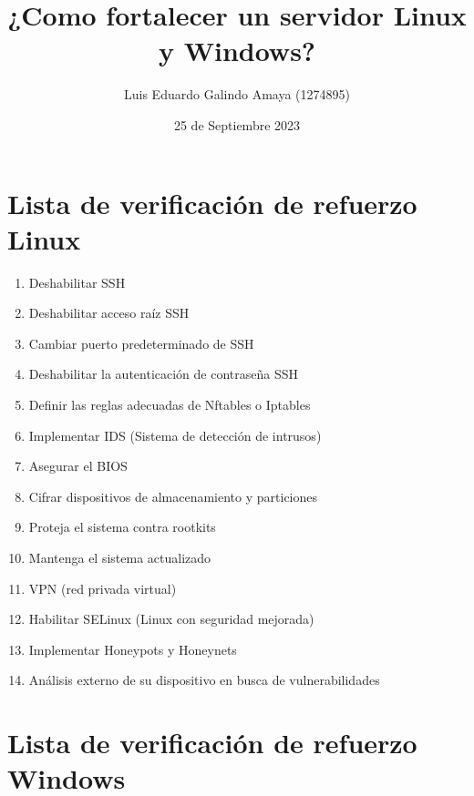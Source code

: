 \documentclass[11pt]{article}
\author{Luis Eduardo Galindo Amaya (1274895)}
\date{25 de Septiembre 2023}
\title{¿Como fortalecer un servidor Linux y Windows?}
\begin{document}
\tableofcontents
\pagebreak
{}

\section{Lista de verificación de refuerzo Linux}
\label{sec:org76e30e7}
\cite{lista_linux}

\begin{enumerate}
\item Deshabilitar SSH
\item Deshabilitar acceso raíz SSH
\item Cambiar puerto predeterminado de SSH
\item Deshabilitar la autenticación de contraseña SSH
\item Definir las reglas adecuadas de Nftables o Iptables
\item Implementar IDS (Sistema de detección de intrusos)
\item Asegurar el BIOS
\item Cifrar dispositivos de almacenamiento y particiones
\item Proteja el sistema contra rootkits
\item Mantenga el sistema actualizado
\item VPN (red privada virtual)
\item Habilitar SELinux (Linux con seguridad mejorada)
\item Implementar Honeypots y Honeynets
\item Análisis externo de su dispositivo en busca de vulnerabilidades
\end{enumerate}

\section{Lista de verificación de refuerzo Windows}
\label{sec:orgeea3405}
\cite{Alex_2021}
\end{document}
